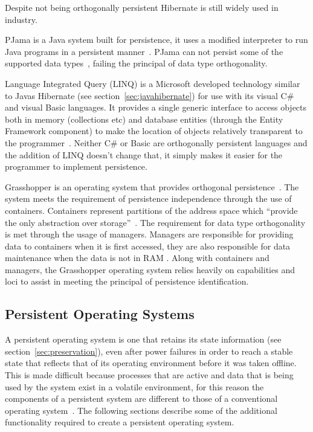 \documentclass[a4paper,12pt]{article}
\begin{document}
Despite not being orthogonally persistent Hibernate is still widely used in industry.
\\\par
\label{sec:pjama}
PJama is a Java system built for persistence, it uses a modified interpreter to run Java programs in a persistent manner~\citep{persistentjavasystem}. PJama can not persist some of the supported data types~\citep{ADearle}, failing the principal of data type orthogonality. 
\\\par
Language Integrated Query (LINQ)
is a Microsoft developed technology similar to Javas Hibernate (see section~\ref{sec:javahibernate}) for use with its visual C\# and visual Basic languages. It provides a single generic interface to access objects both in memory (collections etc) and database entities (through the Entity Framework component) to make the location of objects relatively transparent to the programmer~\citep{ADearle}.
Neither C\# or Basic are orthogonally persistent languages and the addition of LINQ doesn't change that, it simply makes it easier for the programmer to implement persistence.
\\\par
Grasshopper\label{sec:grasshopper} 
is an operating system that provides orthogonal persistence~\citep{Grasshopper}. 
The system meets the requirement of persistence independence through the use of containers. Containers represent partitions of the address space which ``provide the only abstraction over storage''~\citep[p~3]{Grasshopper}.
The requirement for data type orthogonality is met through the usage of managers. Managers are responsible for providing data to containers when it is first accessed, they are also responsible for data maintenance when the data is not in RAM \citep{Grasshopper}.
Along with containers and managers, the Grasshopper operating system relies heavily on capabilities and loci to assist in meeting the principal of persistence identification.
\\\par
\subsection{Persistent Operating Systems}\label{sec:persistentOS}
A persistent operating system is one that retains its state information (see section~\ref{sec:preservation}), even after power failures in order to reach a stable state that reflects that of its operating environment before it was taken offline. This is made difficult because processes that are active and data that is being used by the system exist in a volatile environment, for this reason the components of a persistent system are different to those of a conventional operating system~\citep{Grasshopper}. The following sections describe some of the additional functionality required to create a persistent operating system.
\end{document}
